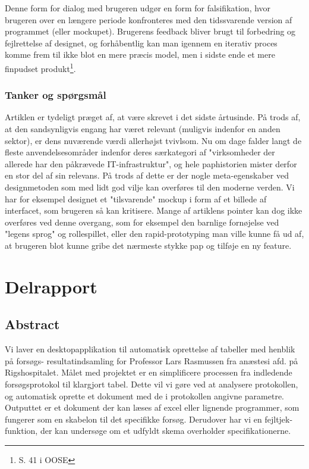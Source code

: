 \documentclass[11pt]{article}
\begin{document}
Denne form for dialog med brugeren udgør en form for falsifikation, hvor brugeren over en længere periode konfronteres med den tidssvarende version af programmet (eller mockupet). Brugerens feedback bliver brugt til forbedring og fejlrettelse af designet, og forhåbentlig kan man igennem en iterativ proces komme frem til ikke blot en mere præcis model, men i sidste ende et mere finpudset produkt\footnote{S. 41 i OOSE\cite{OOSE}}.

\subsubsection{Tanker og spørgsmål}
Artiklen er tydeligt præget af, at være skrevet i det sidste årtusinde. På trods af, at den sandsynligvis engang har været relevant (muligvis indenfor en anden sektor), er dens nuværende værdi allerhøjst tvivlsom. Nu om dage falder langt de fleste anvendelsesområder indenfor deres særkategori af "virksomheder der allerede har den påkrævede IT-infrastruktur", og hele paphistorien mister derfor en stor del af sin relevans. På trods af dette er der nogle meta-egenskaber ved designmetoden som med lidt god vilje kan overføres til den moderne verden. Vi har for eksempel designet et "tilsvarende" mockup i form af et billede af interfacet, som brugeren så kan kritisere. Mange af artiklens pointer kan dog ikke overføres ved denne overgang, som for eksempel den barnlige fornøjelse ved "legens sprog" og rollespillet, eller den rapid-prototyping man ville kunne få ud af, at brugeren blot kunne gribe det nærmeste stykke pap og tilføje en ny feature.

\pagebreak
\section{Delrapport}
\subsection{Abstract}
Vi laver en desktopapplikation til automatisk oprettelse af tabeller med henblik på forsøgs- resultatindsamling for Professor Lars Rasmussen fra anæstesi afd. på Rigshospitalet. Målet med projektet er en simplificere processen fra indledende forsøgsprotokol til klargjort tabel. Dette vil vi gøre ved at analysere protokollen, og automatisk oprette et dokument med de i protokollen angivne parametre. Outputtet er et dokument der kan læses af excel eller lignende programmer, som fungerer som en skabelon til det specifikke forsøg. Derudover har vi en fejltjek-funktion, der kan undersøge om et udfyldt skema overholder specifikationerne.
\end{document}

